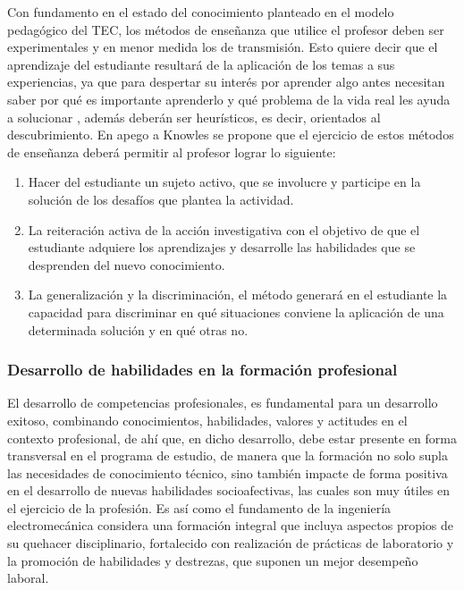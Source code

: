 Con fundamento en el estado del conocimiento planteado en el modelo pedagógico del TEC, los métodos de enseñanza que utilice el profesor deben ser experimentales y en menor medida los de transmisión. Esto quiere decir que el aprendizaje del estudiante resultará de la aplicación de los temas a sus experiencias, ya que para despertar su interés por aprender algo antes necesitan saber por qué es importante aprenderlo y qué problema de la vida real les ayuda a solucionar , además deberán ser heurísticos, es decir, orientados al descubrimiento. En apego a Knowles  se propone que el ejercicio de estos métodos de enseñanza deberá permitir al profesor lograr lo siguiente:\par

\begin{enumerate}
\item Hacer del estudiante un sujeto activo, que se involucre y participe en la solución de los desafíos que plantea la actividad.
\item La reiteración activa de la acción investigativa con el objetivo de que el estudiante adquiere los aprendizajes y desarrolle las habilidades que se desprenden del nuevo conocimiento.
\item La generalización y la discriminación, el método generará en el estudiante la capacidad para discriminar en qué situaciones conviene la aplicación de una determinada solución y en qué otras no.
\end{enumerate}
\subsubsection*{Desarrollo de habilidades en la formación profesional}

El desarrollo de competencias profesionales, es fundamental para un desarrollo exitoso, combinando conocimientos, habilidades, valores y actitudes en el contexto profesional, de ahí que, en dicho desarrollo, debe estar presente en forma transversal en el programa de estudio, de manera que la formación no solo  supla las necesidades de conocimiento técnico, sino también impacte de forma positiva en  el desarrollo de nuevas habilidades socioafectivas, las cuales son muy útiles en el ejercicio de la profesión. Es así como el fundamento de la ingeniería electromecánica considera una formación integral que incluya aspectos propios de su quehacer disciplinario, fortalecido con realización de prácticas de laboratorio y la promoción de habilidades y destrezas, que suponen un mejor desempeño laboral.\par

